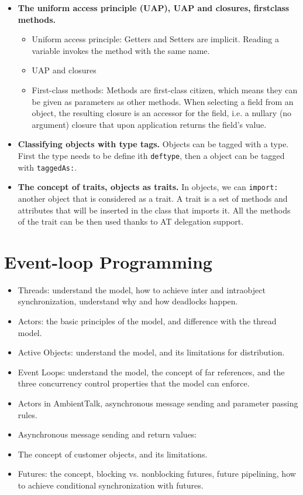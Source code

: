 \documentclass[a4paper]{report}
\begin{document}
\begin{itemize}
  \item \textbf{The uniform access principle (UAP), UAP and closures, firstclass methods.}
  \begin{itemize}
    \item Uniform access principle: Getters and Setters are implicit. Reading a variable invokes the method with the same name.
    \item UAP and closures \todo{}
    \item First-class methods: Methods are first-class citizen, which means they can be given as parameters as other methods. When selecting a field from an object, the resulting closure is an accessor for the field, i.e. a nullary (no argument) closure that upon application returns the field’s value.
  \end{itemize}
  \item \textbf{Classifying objects with type tags.}
  Objects can be tagged with a type. First the type needs to be define ith \texttt{deftype}, then a object can be tagged with \texttt{taggedAs:}.

  \item \textbf{The concept of traits, objects as traits.}
  In objects, we can \texttt{import:} another object that is considered as a trait. A trait is a set of methods and attributes that will be inserted in the class that imports it. All the methods of the trait can be then used thanks to AT delegation support.

\end{itemize}




\chapter{Event-loop Programming}
\begin{itemize}
  \item Threads: understand the model, how to achieve inter and intraobject synchronization,  understand why and how deadlocks happen.
  \item Actors: the basic principles of the model, and difference with the thread model.
  \item Active Objects: understand the model, and its limitations for distribution.
  \item Event Loops: understand the model, the concept of far references, and the three
  concurrency control properties that the model can enforce.
  \item Actors in AmbientTalk, asynchronous message sending and parameter passing rules.
  \item Asynchronous message sending and return values:
  \item The concept of customer objects, and its limitations.
  \item Futures: the concept, blocking vs. nonblocking futures, future pipelining, how to
  achieve conditional synchronization with futures.
\end{itemize}
\end{document}
